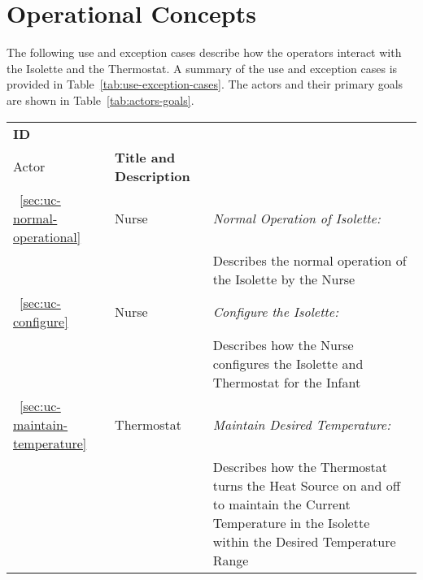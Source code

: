 \chapter{Operational Concepts}
\label{chap:operational-concepts}

The following use and exception cases describe how the operators
interact with the Isolette and the Thermostat. A summary of the use
and exception cases is provided in Table~\ref{tab:use-exception-cases}.
The actors and their primary goals are shown in Table~\ref{tab:actors-goals}.

\begin{table}
\begin{tabular}{|l|l|l|}
\hline   
{\bf ID} & \begin{minipage}[t]{2cm} {\bf Primary \\ Actor} \end{minipage} & {\bf Title and Description}
\\[1em]
\hline
~\ref{sec:uc-normal-operational} & Nurse & \emph{Normal Operation of Isolette:} \\
      &        & \hspace{3mm} 
                  \begin{minipage}[t]{11cm}
                    Describes the normal operation of the Isolette by the Nurse
                  \end{minipage}  
\\[1em]      
\hline
~\ref{sec:uc-configure} & Nurse & \emph{Configure the Isolette:} \\
      &        & \hspace{3mm} 
                  \begin{minipage}[t]{11cm}
                     Describes how the Nurse configures the Isolette and Thermostat for the Infant
                   \end{minipage}
\\[1em]
\hline
~\ref{sec:uc-maintain-temperature} & Thermostat & \emph{Maintain Desired Temperature:} \\
      &        & \hspace{3mm} 
                  \begin{minipage}[t]{11cm}
                     Describes how the Thermostat turns the Heat Source on and off to 
                     maintain the Current Temperature in the Isolette within the 
                     Desired Temperature Range
                   \end{minipage}
\\[1em]

\end{tabular}
\end{table}
